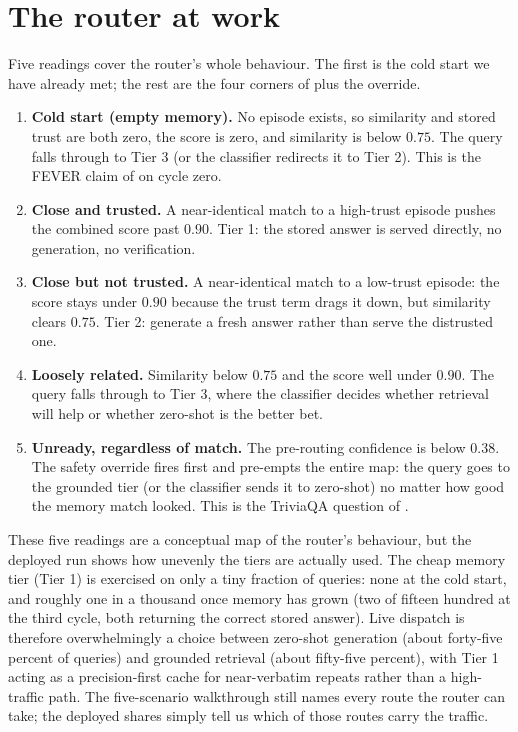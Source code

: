 \section{The router at work}
\label{sec:router-scenarios}

Five readings cover the router's whole behaviour. The first is the cold start we have
already met; the rest are the four corners of  plus the override.

\begin{scenario}
\begin{enumerate}[leftmargin=1.5em, itemsep=2pt]
  \item \textbf{Cold start (empty memory).} No episode exists, so similarity and stored
  trust are both zero, the score is zero, and similarity is below $0.75$. The query falls
  through to Tier 3 (or the classifier redirects it to Tier 2). This is the FEVER claim of
   on cycle zero.
  \item \textbf{Close and trusted.} A near-identical match to a high-trust episode pushes
  the combined score past $0.90$. Tier 1: the stored answer is served directly, no
  generation, no verification.
  \item \textbf{Close but not trusted.} A near-identical match to a low-trust episode: the
  score stays under $0.90$ because the trust term drags it down, but similarity clears
  $0.75$. Tier 2: generate a fresh answer rather than serve the distrusted one.
  \item \textbf{Loosely related.} Similarity below $0.75$ and the score well under $0.90$.
  The query falls through to Tier 3, where the classifier decides whether retrieval will
  help or whether zero-shot is the better bet.
  \item \textbf{Unready, regardless of match.} The pre-routing confidence is below $0.38$.
  The safety override fires first and pre-empts the entire map: the query goes to the
  grounded tier (or the classifier sends it to zero-shot) no matter how good the memory
  match looked. This is the TriviaQA question of .
\end{enumerate}
\end{scenario}

These five readings are a conceptual map of the router's behaviour, but the deployed
run shows how unevenly the tiers are actually used. The cheap memory tier (Tier 1) is
exercised on only a tiny fraction of queries: none at the cold start, and roughly one
in a thousand once memory has grown (two of fifteen hundred at the third cycle, both
returning the correct stored answer). Live dispatch is therefore overwhelmingly a
choice between zero-shot generation (about forty-five percent of queries) and grounded
retrieval (about fifty-five percent), with Tier 1 acting as a precision-first cache for
near-verbatim repeats rather than a high-traffic path. The five-scenario walkthrough
still names every route the router can take; the deployed shares simply tell us which
of those routes carry the traffic.

